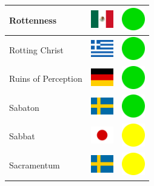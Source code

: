 \documentclass[12pt, a4paper, twoside]{report}
\begin{document}
\begin{center}
\begin{longtable}{|p{5cm}|p{2cm}|p{2cm}|}
 Rottenness                                                 & \includegraphics[width=1cm]{../img/flags/mx} &   \includegraphics[width=1cm]{../likes/y} \\ \hline
 Rotting Christ                                             & \includegraphics[width=1cm]{../img/flags/gr} &   \includegraphics[width=1cm]{../likes/y} \\ \hline
 Ruins of Perception                                        & \includegraphics[width=1cm]{../img/flags/de} &   \includegraphics[width=1cm]{../likes/y} \\ \hline
 Sabaton                                                    & \includegraphics[width=1cm]{../img/flags/se} &   \includegraphics[width=1cm]{../likes/y} \\ \hline
 Sabbat                                                     & \includegraphics[width=1cm]{../img/flags/jp} &   \includegraphics[width=1cm]{../likes/m} \\ \hline
 Sacramentum﻿                                                & \includegraphics[width=1cm]{../img/flags/se} &   \includegraphics[width=1cm]{../likes/m} \\ \hline

\end{longtable}
\end{center}
\end{document}
